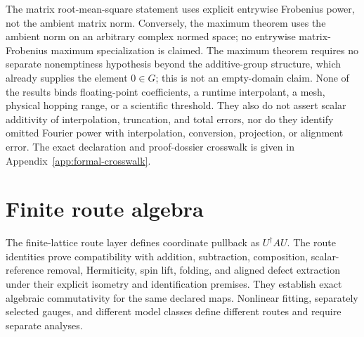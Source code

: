 The matrix root-mean-square statement uses explicit entrywise Frobenius power, not the
ambient matrix norm.  Conversely, the maximum theorem uses the ambient norm on an
arbitrary complex normed space; no entrywise matrix-Frobenius maximum specialization is
claimed. The maximum theorem requires no separate nonemptiness hypothesis beyond the
additive-group structure, which already supplies the element $0\in G$; this is not an
empty-domain claim.  None of the results binds floating-point coefficients, a runtime interpolant, a mesh, physical hopping range, or
a scientific threshold. They also do not assert scalar additivity of interpolation,
truncation, and total errors, nor do they identify omitted Fourier power with
interpolation, conversion, projection, or alignment error. The exact declaration and proof-dossier crosswalk is given
in Appendix~\ref{app:formal-crosswalk}.

\section{Finite route algebra}

The finite-lattice route layer defines coordinate pullback as $U^{\dagger}AU$. The
route identities prove compatibility with addition, subtraction, composition,
scalar-reference removal, Hermiticity, spin lift, folding, and aligned defect extraction
under their explicit isometry and identification premises.
They establish exact algebraic commutativity for the same declared maps. Nonlinear
fitting, separately selected gauges, and different model classes define different
routes and require separate analyses.
